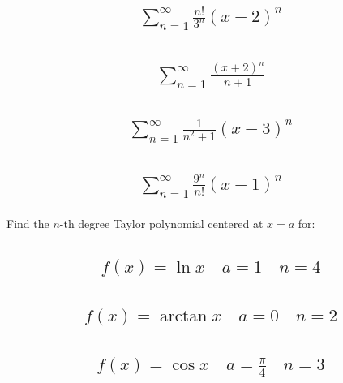 \documentclass{article}
\begin{document}
\subsection{
	\begin{align*}
		\sum_{n = 1}^{\infty} \frac{n!}{3^n} (x - 2)^n
	\end{align*}
}

\subsection{
	\begin{align*}
		\sum_{n = 1}^{\infty} \frac{(x + 2)^n}{n + 1}
	\end{align*}
}

\subsection{
	\begin{align*}
		\sum_{n = 1}^{\infty} \frac{1}{n^2 + 1} (x - 3)^n
	\end{align*}
}

\subsection{
	\begin{align*}
		\sum_{n = 1}^{\infty} \frac{9^n}{n!} (x - 1)^n
	\end{align*}
}

Find the $n$-th degree Taylor polynomial centered at $x = a$ for:
\subsection{
	\begin{align*}
		f(x) = \ln{x} \quad a = 1 \quad n = 4
	\end{align*}
}

\subsection{
	\begin{align*}
		f(x) = \arctan{x} \quad a = 0 \quad n = 2
	\end{align*}
}

\subsection{
	\begin{align*}
		f(x) = \cos{x} \quad a = \frac{\pi}{4} \quad n = 3
	\end{align*}
}
\end{document}
